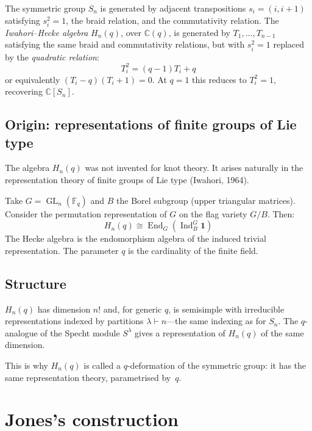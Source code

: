 \documentclass[12pt]{article}
\DeclareMathOperator{\End}{End}
\DeclareMathOperator{\Ind}{Ind}
\DeclareMathOperator{\GL}{GL}
\begin{document}
The symmetric group $S_n$ is generated by adjacent transpositions
$s_i = (i, i{+}1)$ satisfying $s_i^2 = 1$, the braid relation, and the
commutativity relation. The \emph{Iwahori--Hecke algebra} $H_n(q)$, over
$\mathbb{C}(q)$, is generated by $T_1, \ldots, T_{n-1}$ satisfying the
same braid and commutativity relations, but with $s_i^2 = 1$ replaced by
the \emph{quadratic relation}:
\begin{equation} \label{eq:hecke-quad}
  T_i^2 = (q-1) T_i + q
\end{equation}
or equivalently $(T_i - q)(T_i + 1) = 0$.
At $q = 1$ this reduces to $T_i^2 = 1$, recovering
$\mathbb{C}[S_n]$.

\subsection{Origin: representations of finite groups of Lie type}

The algebra $H_n(q)$ was not invented for knot theory. It arises naturally
in the representation theory of finite groups of Lie type (Iwahori, 1964).

Take $G = \GL_n(\mathbb{F}_q)$ and $B$ the Borel subgroup
(upper triangular matrices). Consider the permutation representation of $G$
on the flag variety $G/B$. Then:
\begin{equation} \label{eq:hecke-endo}
  H_n(q) \cong \End_G\!\left(\Ind_B^G \mathbf{1}\right)
\end{equation}
The Hecke algebra is the endomorphism algebra of the induced trivial
representation. The parameter $q$ is the cardinality of the finite field.

\subsection{Structure}

$H_n(q)$ has dimension $n!$ and, for generic $q$, is semisimple with
irreducible representations indexed by partitions $\lambda \vdash n$---the
same indexing as for $S_n$. The $q$-analogue of the Specht module
$S^\lambda$ gives a representation of $H_n(q)$ of the same dimension.

This is why $H_n(q)$ is called a $q$-deformation of the symmetric group:
it has the same representation theory, parametrised by~$q$.

\section{Jones's construction}
\end{document}

